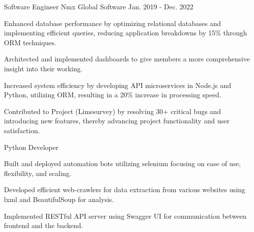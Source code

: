

\begin{cventries}

  \cventry
    {Software Engineer} %
    {Nmx Global Software} %
    {} %
    {Jan. 2019 - Dec. 2022} %
    {
      \begin{cvitems} %
        \item {Enhanced database performance by optimizing relational databases and implementing efficient queries, reducing application breakdowns by 15\% through ORM techniques.}
        \item {Architected and implemented dashboards to give members a more comprehensive insight into their working.}
        \item {Increased system efficiency by developing API microservices in Node.js and Python, utilizing ORM, resulting in a 20\% increase in processing speed.}
        \item {Contributed to Project (Limesurvey) by resolving 30+ critical bugs and introducing new features, thereby advancing project functionality and user satisfaction.}
      \end{cvitems}
    }

  \cventry
    {Python Developer} %
    {} %
    {} %
    {} %
    {
      \begin{cvitems} %
        \item {Built and deployed automation bots utilizing selenium focusing on ease of use, flexibility, and scaling.}
        \item {Developed efficient web-crawlers for data extraction from various websites using lxml and BeautifulSoup for analysis.}
        \item {Implemented RESTful API server using Swagger UI for communication between frontend and the backend. }
      \end{cvitems}
    }

\end{cventries}
